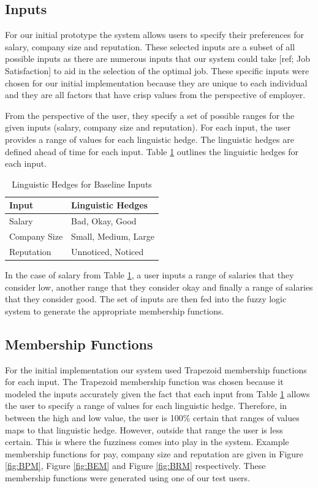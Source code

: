 \documentclass[12pt,fleqn,reqno,letterpaper]{article}
\begin{document}
\subsection{Inputs}
For our initial prototype the system allows users to specify their preferences for salary, company size and reputation. These selected inputs are a subset of all possible inputs as there are numerous inputs that our system could take [ref; Job Satisfaction] to aid in the selection of the optimal job. These specific inputs were chosen for our initial implementation because they are unique to each individual and they are all factors that have crisp values from the perspective of employer.

From the perspective of the user, they specify a set of possible ranges for the given inputs (salary, company size and reputation). For each input, the user provides a range of values for each linguistic hedge. The linguistic hedges are defined ahead of time for each input. Table \ref{tbl:LINGUISTIC-HEDGES} outlines the linguistic hedges for each input.


\begin{table}[h]
  \caption{Linguistic Hedges for Baseline Inputs}
  \label{tbl:LINGUISTIC-HEDGES}
  \centering
\begin{tabular}{|l|l|}
\hline
\textbf{Input} & \textbf{Linguistic Hedges} \\ \hline
Salary         & Bad, Okay, Good            \\ \hline
Company Size   & Small, Medium, Large       \\ \hline
Reputation     & Unnoticed, Noticed         \\ \hline
\end{tabular}
\end{table}

In the case of salary from Table \ref{tbl:LINGUISTIC-HEDGES}, a user inputs a range of salaries that they consider low, another range that they consider okay and finally a range of salaries that they consider good. The set of inputs are then fed into the fuzzy logic system to generate the appropriate membership functions.

\subsection{Membership Functions}
\label{sec:membership_fn}
For the initial implementation our system used Trapezoid membership functions for each input. The Trapezoid membership function was chosen because it modeled the inputs accurately given the fact that each input from Table \ref{tbl:LINGUISTIC-HEDGES} allows the user to specify a range of values for each linguistic hedge. Therefore, in between the high and low value, the user is 100\% certain that ranges of values maps to that linguistic hedge. However, outside that range the user is less certain. This is where the fuzziness comes into play in the system. Example membership functions for pay, company size and reputation are given in Figure \ref{fig:BPM}, Figure \ref{fig:BEM} and Figure \ref{fig:BRM} respectively. These membership functions were generated using one of our test users.
\end{document}
